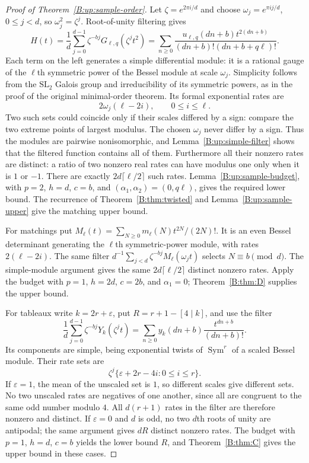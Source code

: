 \documentclass[11pt,a4paper]{article}
\theoremstyle{definition}
\theoremstyle{remark}
\numberwithin{equation}{section}
\begin{document}
\begin{proof}[Proof of Theorem~\ref{B:up:sample-order}]
Let $\zeta=e^{2\pi i/d}$ and choose
$\omega_j=e^{\pi i j/d}$, $0\le j<d$, so
$\omega_j^2=\zeta^j$.  Root-of-unity filtering gives
\[
 H(t)=\frac1d\sum_{j=0}^{d-1}\zeta^{-bj}
 G_{\ell,q}(\zeta^jt^2)
 =\sum_{n\ge0}
 \frac{u_{\ell,q}(dn+b)t^{2(dn+b)}}
 {(dn+b)!(dn+b+q\ell)!}.
\]
Each term on the left generates a simple differential module:
it is a rational gauge of the $\ell$th symmetric power of the
Bessel module at scale $\omega_j$.  Simplicity follows from
the $\mathrm{SL}_2$ Galois group and irreducibility of its
symmetric powers, as in the proof of the original minimal-order
theorem.  Its formal exponential rates are
\[
 2\omega_j(\ell-2i),\qquad 0\le i\le\ell.
\]
Two such sets could coincide only if their scales differed by a
sign: compare the two extreme points of largest modulus.
The chosen $\omega_j$ never differ by a sign.  Thus the modules
are pairwise nonisomorphic, and Lemma~\ref{B:up:simple-filter}
shows that the filtered function contains all of them.
Furthermore all their nonzero rates are distinct: a ratio of two
nonzero real rates can have modulus one only when it is $1$ or
$-1$.  There are exactly
$2d\lceil\ell/2\rceil$ such rates.
Lemma~\ref{B:up:sample-budget}, with
$p=2$, $h=d$, $c=b$, and $(\alpha_1,\alpha_2)=(0,q\ell)$,
gives the required lower bound.  The recurrence of
Theorem~\ref{B:thm:twisted} and Lemma~\ref{B:up:sample-upper}
give the matching upper bound.

For matchings put
$M_\ell(t)=\sum_{N\ge0}m_\ell(N)t^{2N}/(2N)!$.
It is an even Bessel determinant generating the $\ell$th
symmetric-power module, with rates $2(\ell-2i)$.
The same filter
$d^{-1}\sum_{j<d}\zeta^{-bj}M_\ell(\omega_jt)$ selects
$N\equiv b\pmod d$.  The simple-module argument gives the
same $2d\lceil\ell/2\rceil$ distinct nonzero rates.
Apply the budget with $p=1$, $h=2d$, $c=2b$, and $\alpha_1=0$;
Theorem~\ref{B:thm:D} supplies the upper bound.

For tableaux write $k=2r+\varepsilon$, put
$R=r+1-[4\mid k]$, and use the filter
\[
 \frac1d\sum_{j=0}^{d-1}\zeta^{-bj}Y_k(\zeta^jt)
 =\sum_{n\ge0}y_k(dn+b)\frac{t^{dn+b}}{(dn+b)!}.
\]
Its components are simple, being exponential twists of
$\operatorname{Sym}^r$ of a scaled Bessel module.  Their rate
sets are
\[
 \zeta^j\{\varepsilon+2r-4i:0\le i\le r\}.
\]
If $\varepsilon=1$, the mean of the unscaled set is $1$, so
different scales give different sets.  No two unscaled rates
are negatives of one another, since all are congruent to the
same odd number modulo $4$.  All $d(r+1)$ rates in the filter
are therefore nonzero and distinct.  If $\varepsilon=0$ and
$d$ is odd, no two $d$th roots of unity are antipodal;
the same argument gives $dR$ distinct nonzero rates.
The budget with $p=1$, $h=d$, $c=b$ yields the lower bound $R$,
and Theorem~\ref{B:thm:C} gives the upper bound in these cases.


\end{proof}
\end{document}
